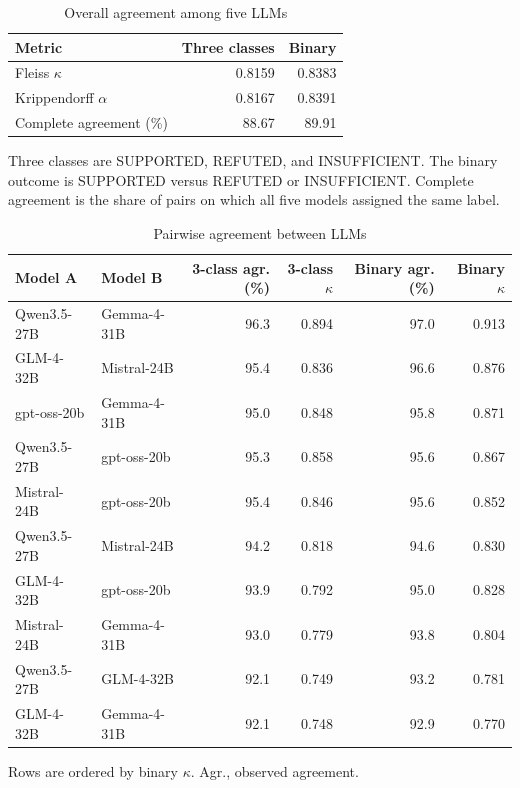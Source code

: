 \documentclass[unnumsec,webpdf,contemporary,large]{oup-authoring-template}
\begin{document}
\begin{table}[H]
\caption{Overall agreement among five LLMs}
\label{tab:s_llm_overall}
\centering
\small
\begin{tabular}{lrr}
\toprule
Metric & Three classes & Binary \\
\midrule
Fleiss \(\kappa\) & 0.8159 & 0.8383 \\
Krippendorff \(\alpha\) & 0.8167 & 0.8391 \\
Complete agreement (\%) & 88.67 & 89.91 \\
\bottomrule
\end{tabular}
\begin{tablenotes}
\item Three classes are SUPPORTED, REFUTED, and INSUFFICIENT. The binary outcome is SUPPORTED versus REFUTED or INSUFFICIENT. Complete agreement is the share of pairs on which all five models assigned the same label.
\end{tablenotes}
\end{table}

\begin{table}[H]
\caption{Pairwise agreement between LLMs}
\label{tab:s_llm_pairwise}
\centering
\small
\begin{tabular}{llrrrr}
\toprule
Model A & Model B & 3-class agr. (\%) & 3-class \(\kappa\) & Binary agr. (\%) & Binary \(\kappa\) \\
\midrule
Qwen3.5-27B & Gemma-4-31B & 96.3 & 0.894 & 97.0 & 0.913 \\
GLM-4-32B & Mistral-24B & 95.4 & 0.836 & 96.6 & 0.876 \\
gpt-oss-20b & Gemma-4-31B & 95.0 & 0.848 & 95.8 & 0.871 \\
Qwen3.5-27B & gpt-oss-20b & 95.3 & 0.858 & 95.6 & 0.867 \\
Mistral-24B & gpt-oss-20b & 95.4 & 0.846 & 95.6 & 0.852 \\
Qwen3.5-27B & Mistral-24B & 94.2 & 0.818 & 94.6 & 0.830 \\
GLM-4-32B & gpt-oss-20b & 93.9 & 0.792 & 95.0 & 0.828 \\
Mistral-24B & Gemma-4-31B & 93.0 & 0.779 & 93.8 & 0.804 \\
Qwen3.5-27B & GLM-4-32B & 92.1 & 0.749 & 93.2 & 0.781 \\
GLM-4-32B & Gemma-4-31B & 92.1 & 0.748 & 92.9 & 0.770 \\
\bottomrule
\end{tabular}
\begin{tablenotes}
\item Rows are ordered by binary \(\kappa\). Agr., observed agreement.
\end{tablenotes}
\end{table}
\end{document}
